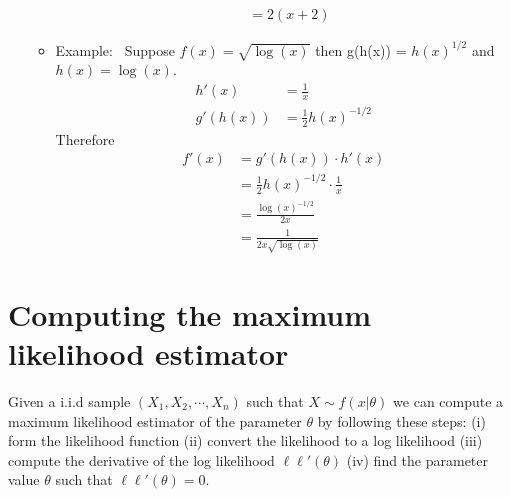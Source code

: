 \begin{itemize}
\begin{itemize}
\begin{align}
                      &= 2(x+2)
            \end{align}
                    \item Example:~ Suppose $f(x) = \sqrt{ \log(x)}$ then g(h(x)) = $h(x)^{1/2}$ and $h(x) = \log(x)$.
            \begin{align}
                h'(x) &= \frac{1}{x}\\
                g'(h(x)) &= \frac{1}{2}h(x)^{-1/2}
            \end{align}
            Therefore 
            \begin{align}
                f'(x) &= g'(h(x)) \cdot h'(x)\\
                      &=  \frac{1}{2}h(x)^{-1/2} \cdot \frac{1}{x}\\
                      &= \frac{\log(x)^{-1/2}}{2x} \\ 
                      &= \frac{1}{2x \sqrt{\log(x)}}
            \end{align}
            
        \end{itemize}
    
      
\end{itemize}


\section{Computing the maximum likelihood estimator}

Given a i.i.d sample $(X_{1},X_{2},\cdots,X_{n})$ such that $X \sim f(x | \theta)$ we can compute a maximum likelihood estimator of the parameter $\theta$  by following these steps: (i) form the likelihood function (ii) convert the likelihood to a log likelihood (iii) compute the derivative of the log likelihood $\ell \ell ' (\theta)$ (iv) find the parameter value $\theta$ such that $\ell \ell ' (\theta) = 0$.

